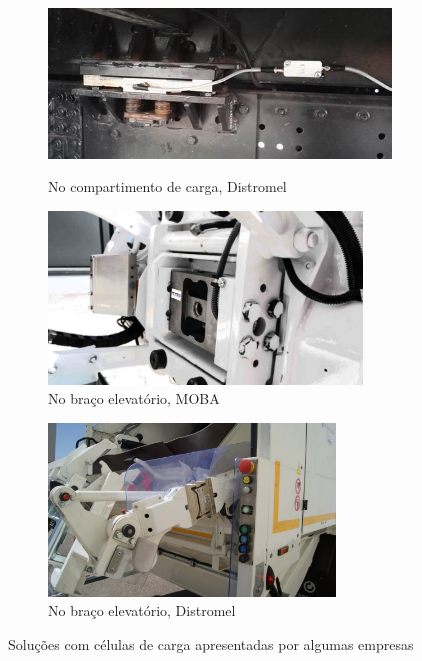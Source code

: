 \documentclass[11pt, a4paper, oneside]{book}
\begin{document}
\begin{figure}[ht]
  \centering
    \begin{subfigure}[b]{1.0\textwidth}
    \centering
    \includegraphics[height = 47mm]{img/distromel-chassis.jpg}
    \caption{No compartimento de carga, Distromel \cite{distromel-news}}
  \end{subfigure}
  
  \vspace{0.5em}
  
  \begin{subfigure}[b]{0.52\textwidth}
    \centering
    \includegraphics[height = 46mm]{img/moba-rear-elevator.jpg}
    \caption{No braço elevatório, MOBA \cite{moba-dynamic-scale}}
  \end{subfigure}
  \begin{subfigure}[b]{0.47\textwidth}
    \centering
    \includegraphics[height = 46mm]{img/distromel-rear-elevator.jpg}
    \caption{No braço elevatório, Distromel \cite{distromel-news}}
  \end{subfigure}
  \caption{Soluções com células de carga apresentadas por algumas empresas}
\end{figure}
\end{document}
